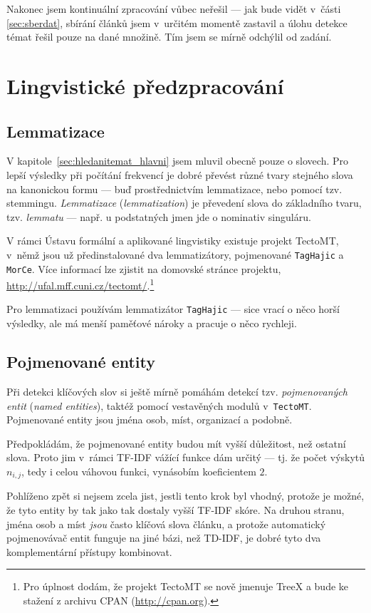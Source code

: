 \documentclass[12pt,a4paper]{report}
\begin{document}
Nakonec jsem kontinuální zpracování vůbec neřešil --- jak bude vidět v~části \ref{sec:sberdat}, sbírání článků jsem v~určitém momentě zastavil a úlohu detekce témat řešil pouze na dané množině. Tím jsem se mírně odchýlil od zadání.


\section{Lingvistické předzpracování}

\subsection{Lemmatizace}

V kapitole~\ref{sec:hledanitemat_hlavni} jsem mluvil obecně pouze o slovech. Pro lepší výsledky při počítání frekvencí je dobré převést různé tvary stejného slova na kanonickou formu --- buď prostřednictvím lemmatizace, nebo pomocí tzv. stemmingu. \emph{Lemmatizace} (\emph{lemmatization}) je převedení slova do základního tvaru, tzv. \emph{lemmatu} --- např. u podstatných jmen jde o nominativ singuláru.

V rámci Ústavu formální a aplikované lingvistiky existuje projekt TectoMT, v~němž jsou už předinstalované dva lemmatizátory, pojmenované \texttt{TagHajic} a \texttt{MorCe}. Více informací lze zjistit na domovské stránce projektu, \url{http://ufal.mff.cuni.cz/tectomt/}.\footnote{Pro úplnost dodám, že projekt TectoMT se nově jmenuje TreeX a bude ke stažení z archivu CPAN (\url{http://cpan.org}).}

Pro lemmatizaci používám lemmatizátor \texttt{TagHajic} --- sice vrací o něco horší výsledky, ale má menší paměťové nároky a pracuje o něco rychleji.

\subsection{Pojmenované entity}
Při detekci klíčových slov si ještě mírně pomáhám detekcí tzv. \emph{pojmenovaných entit} (\emph{named entities}), taktéž pomocí vestavěných modulů v~\texttt{TectoMT}. Pojmenované entity jsou jména osob, míst, organizací a podobně.

Předpokládám, že pojmenované entity budou mít vyšší důležitost, než ostatní slova. Proto jim v~rámci TF-IDF vážící funkce dám určitý  --- tj. že počet výskytů $n_{i,j}$, tedy i celou váhovou funkci, vynásobím koeficientem $2$.

Pohlíženo zpět si nejsem zcela jist, jestli tento krok byl vhodný, protože je možné, že tyto entity by tak jako tak dostaly vyšší TF-IDF skóre. Na druhou stranu, jména osob a míst \emph{jsou} často klíčová slova článku, a protože automatický pojmenovávač entit funguje na jiné bázi, než TD-IDF, je dobré tyto dva komplementární přístupy kombinovat.
\end{document}
